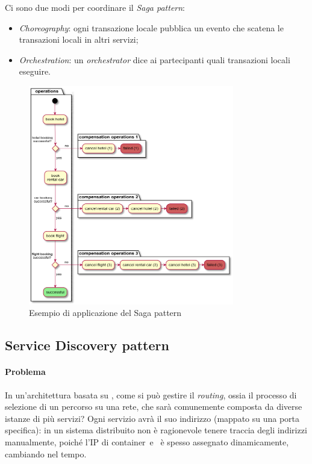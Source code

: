 Ci sono due modi per coordinare il \textit{Saga pattern}:
\begin{itemize}
	\item \textit{Choreography}: ogni transazione locale pubblica un evento che scatena le transazioni locali in altri servizi;
	\item \textit{Orchestration}: un \textit{orchestrator} dice ai partecipanti quali transazioni locali eseguire.
\end{itemize}

\begin{figure}[H]
	\centering
	\includegraphics[width=0.8\textwidth]{immagini/saga-example.png}
	\caption[Esempio di Saga pattern]{Esempio di applicazione del Saga pattern\footnotemark}
\end{figure}


\subsection{Service Discovery pattern}\label{service-discovery}

\paragraph*{Problema} In un'architettura basata su , come si può gestire il \textit{routing}, ossia il processo di selezione di un percorso su una rete, che sarà comunemente composta da diverse istanze di più servizi?
Ogni servizio avrà il suo indirizzo (mappato su una porta specifica):  in un sistema distribuito non è ragionevole tenere traccia degli indirizzi manualmente, poiché l'IP di \gls{container}\gloss\ e \gloss\ è spesso assegnato dinamicamente, cambiando nel tempo.

